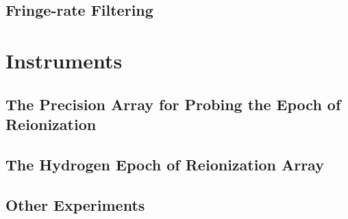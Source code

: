 \subsection{Fringe-rate Filtering}

\section{Instruments}
\subsection{The Precision Array for Probing the Epoch of Reionization}
\subsection{The Hydrogen Epoch of Reionization Array}
\subsection{Other Experiments}

\nocite{*}







